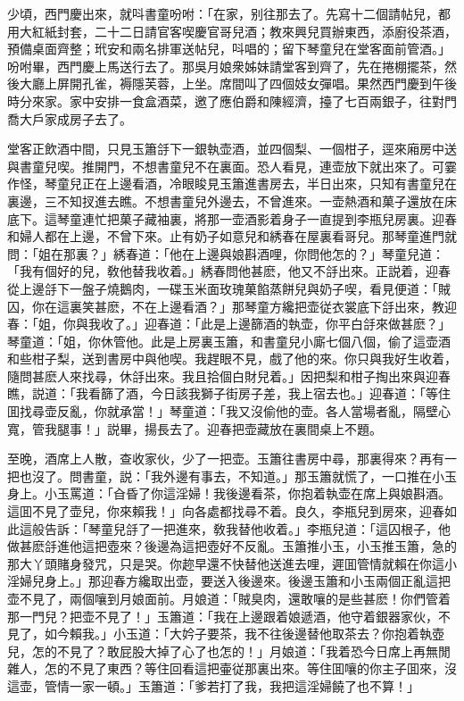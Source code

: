 少頃，西門慶出來，就呌書童吩咐：「在家，别往那去了。先寫十二個請帖兒，都用大紅紙封套，二十二日請官客喫慶官哥兒酒；教來興兒買辦東西，添廚役茶酒，預備桌面齊整；玳安和兩名排軍送帖兒，呌唱的；留下琴童兒在堂客面前管酒。」吩咐畢，西門慶上馬送行去了。那吳月娘衆姊妹請堂客到齊了，先在捲棚擺茶，然後大廳上屏開孔雀，褥隱芙蓉，上坐。席間叫了四個妓女彈唱。果然西門慶到午後時分來家。家中安排一食盒酒菜，邀了應伯爵和陳經濟，擡了七百兩銀子，往對門喬大戶家成房子去了。

堂客正飲酒中間，只見玉簫㧱下一銀執壶酒，並四個梨、一個柑子，逕來廂房中送與書童兒喫。推開門，不想書童兒不在裏面。恐人看見，連壶放下就出來了。可霎作怪，琴童兒正在上邊看酒，冷眼睃見玉簫進書房去，半日出來，只知有書童兒在裏邊，三不知扠進去瞧。不想書童兒外邊去，不曾進來。一壶熱酒和菓子還放在床底下。這琴童連忙把菓子藏袖裏，將那一壶酒影着身子一直提到李瓶兒房裏。迎春和婦人都在上邊，不曾下來。止有奶子如意兒和綉春在屋裏看哥兒。那琴童進門就問：「姐在那裏？」綉春道：「他在上邊與娘斟酒哩，你問他怎的？」琴童兒道：「我有個好的兒，敎他替我收着。」綉春問他甚麽，他又不㧱出來。正説着，迎春從上邊㧱下一盤子燒鵝肉，一碟玉米面玫瑰菓餡蒸餅兒與奶子喫，看見便道：「賊囚，你在這裏笑甚麽，不在上邊看酒？」那琴童方纔把壶従衣裳底下㧱出來，教迎春：「姐，你與我收了。」迎春道：「此是上邊篩酒的執壶，你平白㧱來做甚麽？」琴童道：「姐，你休管他。此是上房裏玉簫，和書童兒小廝七個八個，偷了這壶酒和些柑子梨，送到書房中與他喫。我趕眼不見，戲了他的來。你只與我好生收着，隨問甚麽人來找尋，休㧱出來。我且拾個白財兒着。」因把梨和柑子掏出來與迎春瞧，説道：「我看篩了酒，今日該我獅子街房子差，我上宿去也。」迎春道：「等住囬找尋壶反亂，你就承當！」琴童道：「我又沒偷他的壶。各人當場者亂，隔壁心寬，管我腿事！」説畢，揚長去了。迎春把壶藏放在裏間桌上不題。

至晚，酒席上人散，查收家伙，少了一把壶。玉簫往書房中尋，那裏得來？再有一把也沒了。問書童，説：「我外邊有事去，不知道。」那玉簫就慌了，一口推在小玉身上。小玉罵道：「㒲昏了你這淫婦！我後邊看茶，你抱着執壶在席上與娘斟酒。這囬不見了壶兒，你來賴我！」向各處都找尋不着。良久，李瓶兒到房來，迎春如此這般告訴：「琴童兒㧱了一把進來，敎我替他收着。」李瓶兒道：「這囚根子，他做甚麽㧱進他這把壺來？後邊為這把壺好不反亂。玉簫推小玉，小玉推玉簫，急的那大丫頭賭身發咒，只是哭。你趂早還不快替他送進去哩，遲囬管情就賴在你這小淫婦兒身上。」那迎春方纔取出壶，要送入後邊來。後邊玉簫和小玉兩個正亂這把壶不見了，兩個嚷到月娘面前。月娘道：「賊臭肉，還敢嚷的是些甚麽！你們管着那一門兒？把壶不見了！」玉簫道：「我在上邊跟着娘遞酒，他守着銀器家伙，不見了，如今賴我。」小玉道：「大妗子要茶，我不往後邊替他取茶去？你抱着執壺兒，怎的不見了？敢屁股大掉了心了也怎的！」月娘道：「我着恐今日席上再無閒雜人，怎的不見了東西？等住回看這把壷従那裏出來。等住囬嚷的你主子囬來，沒這壶，管情一家一頓。」玉簫道：「爹若打了我，我把這淫婦饒了也不算！」

